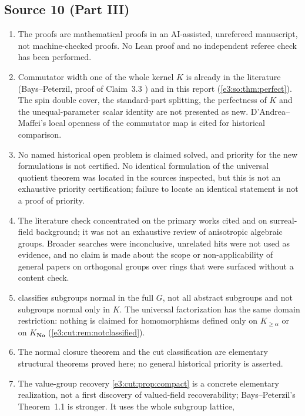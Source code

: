 \documentclass[11pt,letterpaper]{article}
\numberwithin{equation}{section}
\theoremstyle{definition}
\theoremstyle{remark}
\newcommand{\No}{\mathbf{No}}
\begin{document}
\subsection{Source 10 (Part III)}\label{e3:cut:sub:nonclaims10}
\begin{enumerate}[label=\textup{C\arabic*.},leftmargin=2.6em]
\item The proofs are mathematical proofs in an AI-assisted, unrefereed
 manuscript, not machine-checked proofs. No Lean proof and no independent
 referee check has been performed.
\item Commutator width one of the whole kernel $K$ is already in the literature
 (Bays--Peterzil, proof of Claim~3.3 \cite{BP}) and in this report
 (\cref{e3:so:thm:perfect}). The spin double cover, the standard-part
 splitting, the perfectness of $K$ and the unequal-parameter scalar identity are
 not presented as new. D'Andrea--Maffei's local openness of the commutator map
 \cite[Theorem~2.5]{DM} is cited for historical comparison.
\item No named historical open problem is claimed solved, and priority for the
 new formulations is not certified. No identical formulation of the universal
 quotient theorem was located in the sources inspected, but this is not an
 exhaustive priority certification; failure to locate an identical statement is
 not a proof of priority.
\item The literature check concentrated on the primary works cited and on
 surreal-field background; it was not an exhaustive review of anisotropic
 algebraic groups. Broader searches were inconclusive, unrelated hits were not
 used as evidence, and no claim is made about the scope or non-applicability of
 general papers on orthogonal groups over rings that were surfaced without a
 content check.
\item {} classifies subgroups normal in the full
 $G$, not all abstract subgroups and not subgroups normal only in $K$. The
 universal factorization has the same domain restriction: nothing is claimed
 for homomorphisms defined only on $K_{\ge\alpha}$ or on $K_{\No}$
 (\cref{e3:cut:rem:notclassified}).
\item The normal closure theorem and the cut classification are elementary
 structural theorems proved here; no general historical priority is asserted.
\item The value-group recovery \cref{e3:cut:prop:compact} is a concrete
 elementary realization, not a first discovery of valued-field recoverability;
 Bays--Peterzil's Theorem~1.1 is stronger. It uses the whole subgroup lattice,

\end{enumerate}
\end{document}
